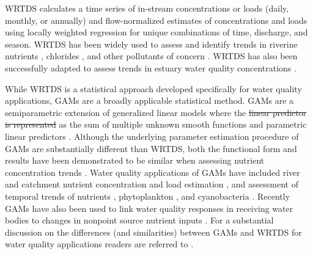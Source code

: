 \documentclass[fleqn,10pt,lineno]{wlpeerj} %
\providecommand{\DIFaddtex}[1]{{\protect\color{blue}\uwave{#1}}} %
\providecommand{\DIFdeltex}[1]{{\protect\color{red}\sout{#1}}}                      %
\providecommand{\DIFaddbegin}{} %
\providecommand{\DIFaddend}{} %
\providecommand{\DIFdelbegin}{} %
\providecommand{\DIFdelend}{} %
\providecommand{\DIFadd}[1]{\texorpdfstring{\DIFaddtex{#1}}{#1}} %
\providecommand{\DIFdel}[1]{\texorpdfstring{\DIFdeltex{#1}}{}} %
\begin{document}
WRTDS calculates a time series of in-stream concentrations or loads
(daily, monthly, or annually) and flow-normalized estimates of
concentrations and loads using locally weighted regression for unique
combinations of time, discharge, and season. WRTDS has been widely used
to assess and identify trends in riverine nutrients
\autocite{oelsner_recent_2019,stackpooleLongTermMississippi2021},
chlorides \autocite{stetsIncreasingChlorideRivers2018}, and other
pollutants of concern \autocite{shodaWaterqualityTrendsRivers2019}.
WRTDS has also been successfully adapted to assess trends in estuary
water quality concentrations \autocite{beckFourDecadesWater2018}.

While WRTDS is a statistical approach developed specifically for water
quality applications, GAMs are a broadly applicable statistical method.
GAMs are a semiparametric extension of generalized linear models where
the \DIFdelbegin \DIFdel{linear predictor is represented }\DIFdelend \DIFaddbegin \DIFadd{response variable is modeled }\DIFaddend as the sum of multiple unknown smooth
functions and parametric linear predictors
\autocite{woodFastStableRestricted2011}. Although the underlying
parameter estimation procedure of GAMs are substantially different than
WRTDS, both the functional form and results have been demonstrated to be
similar when assessing nutrient concentration trends
\autocite{beckNumericalQualitativeContrasts2017}. Water quality
applications of GAMs have included river and catchment nutrient
concentration and load estimation
\autocite{wangLoadEstimationUncertainties2011,kroonRiverLoadsSuspended2012,kuhnertQuantifyingTotalSuspended2012,robson_prediction_2015-1,hagemannEstimatingNutrientOrganic2016,mcdowell_implications_2021,biagi_novel_2022},
and assessment of temporal trends of nutrients
\autocite{beckNumericalQualitativeContrasts2017,murphyGeneralizedAdditiveModel2019},
phytoplankton \autocite{bergbuschUnexpectedShiftPhytoplankton2021}, and
cyanobacteria \autocite{hayesEffectsLakeWarming2020}. Recently GAMs have
also been used to link water quality responses in receiving water bodies
to changes in nonpoint source nutrient inputs
\autocite{murphyNutrientImprovementsChesapeake2022}. For a substantial
discussion on the differences (and similarities) between GAMs and WRTDS
for water quality applications readers are referred to
\textcite{beckNumericalQualitativeContrasts2017}.
\end{document}
